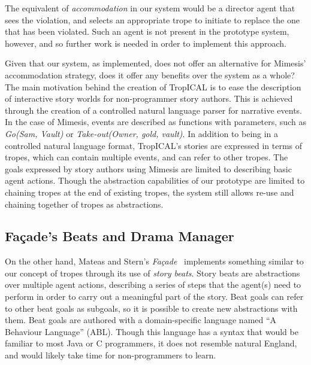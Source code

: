 \documentclass[11pt]{report}
\begin{document}
The equivalent of \emph{accommodation} in our system would be a director agent
that sees the violation, and selects an appropriate trope to initiate to replace
the one that has been violated. Such an agent is not present in the prototype
system, however, and so further work is needed in order to implement this approach.

Given that our system, as implemented, does not offer an alternative for
Mimesis' accommodation strategy, does it offer any benefits over the system as a
whole? The main motivation behind the creation of TropICAL is to ease the
description of interactive story worlds for non-programmer story authors. This
is achieved through the creation of a controlled natural language parser for
narrative events. In the case of Mimesis, events are described as functions with
parameters, such as \emph{Go(Sam, Vault)} or \emph{Take-out(Owner, gold,
  vault)}. In addition to being in a controlled natural language format,
TropICAL's stories are expressed in terms of tropes, which can contain multiple
events, and can refer to other tropes. The goals expressed by story authors
using Mimesis are limited to describing basic agent actions. Though the
abstraction capabilities of our prototype are limited to chaining tropes at the
end of existing tropes, the system still allows re-use and chaining together of
tropes as abstractions.

\subsection{Fa\c{c}ade's Beats and Drama Manager}
On the other hand, Mateas and Stern's
\emph{Fa\c{c}ade}~\citep{mateas2003faccade} implements something similar to our
concept of tropes through its use of \emph{story beats}. Story beats are
abstractions over multiple agent actions, describing a series of steps that the
agent(s) need to perform in order to carry out a meaningful part of the story.
Beat goals can refer to other beat goals as subgoals, so it is possible to
create new abstractions with them. Beat goals are authored with a
domain-specific language named ``A Behaviour Language'' (ABL). Though this
language has a syntax that would be familiar to most Java or C programmers, it
does not resemble natural England, and would likely take time for
non-programmers to learn.
\end{document}
